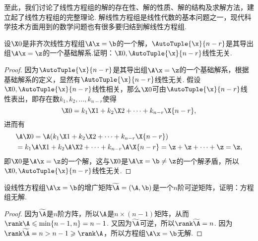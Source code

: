 至此，我们讨论了线性方程组的解的存在性、解的性质、解的结构及求解方法，建立起了线性方程组的完整理论.
解线性方程组是线性代数的基本问题之一，现代科学技术方面用到的数学问题也有很多要归结到解线性方程组.

\begin{example}
设\(\X0\)是非齐次线性方程组\(\A\x=\b\)的一个解，\(\AutoTuple{\x}{n-r}\)是其导出组\(\A\x=\z\)的一个基础解系.证明：\(\X0,\AutoTuple{\x}{n-r}\)线性无关.
\begin{proof}
因为\(\AutoTuple{\x}{n-r}\)是其导出组\(\A\x=\z\)的一个基础解系，根据基础解系的定义，显然有\(\AutoTuple{\x}{n-r}\)线性无关.
假设\(\X0,\AutoTuple{\x}{n-r}\)线性相关，那么\(\X0\)可由\(\AutoTuple{\x}{n-r}\)线性表出，即存在数\(k_1,k_2,\dotsc,k_{n-r}\)使得\[
\X0 = k_1 \X1 + k_2 \X2 + \dotsb + k_{n-r} \X{n-r},
\]进而有\begin{align*}
&\A\X0 = \A(k_1 \X1 + k_2 \X2 + \dotsb + k_{n-r} \X{n-r}) \\
&= k_1 \A\X1 + k_2 \A\X2 + \dotsb + k_{n-r} \A\X{n-r}
= \z + \z + \dotsb + \z = \z,
\end{align*}即\(\X0\)是\(\A\x=\z\)的一个解，这与\(\X0\)是\(\A\x=\b\neq\z\)的一个解矛盾，所以\(\X0,\AutoTuple{\x}{n-r}\)线性无关.
\end{proof}
\end{example}

\begin{example}
\def\wA{\widetilde{\A}}
设线性方程组\(\A\x=\b\)的增广矩阵\(\wA = (\A,\b)\)是一个\(n\)阶可逆矩阵，证明：方程组无解.
\begin{proof}
因为\(\wA\)是\(n\)阶方阵，所以\(\A\)是\(n \times (n-1)\)矩阵，从而\(\rank\A \leqslant \min\{n-1,n\} = n-1\).
又因为\(\wA\)可逆，所以\(\rank\wA = n\).
因为\(\rank\wA = n > n-1 \geqslant \rank\A\)，所以方程组\(\A\x=\b\)无解.
\end{proof}
\end{example}
